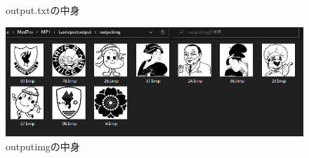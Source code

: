 \begin{enumerate}
\begin{figure}[htbp]
\begin{minipage}[t]{0.66\hsize}
      \centering
      \caption{output.txtの中身}
      \label{graph:33}
    \end{minipage}
    \begin{minipage}[t]{\hsize}
      \includegraphics[scale=0.6]{入力6.PNG}
      \centering
      \caption{outputimgの中身}
      \label{graph:34}
    \end{minipage}
  \end{figure}
\end{enumerate}
